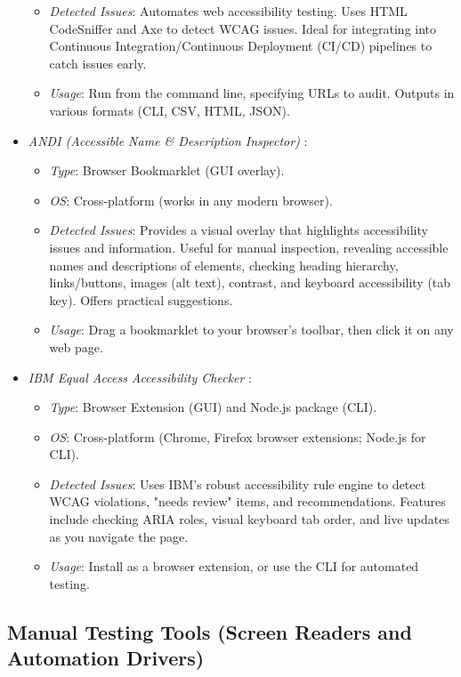 \begin{itemize}
\begin{itemize}
            \item \emph{Detected Issues}: Automates web accessibility testing. Uses HTML CodeSniffer and Axe to detect WCAG issues. Ideal for integrating into Continuous Integration/Continuous Deployment (CI/CD) pipelines to catch issues early.
            \item \emph{Usage}: Run from the command line, specifying URLs to audit. Outputs in various formats (CLI, CSV, HTML, JSON).
        \end{itemize}
    \item \emph{ANDI (Accessible Name \& Description Inspector)} \cite{andi}:
        \begin{itemize}
            \item \emph{Type}: Browser Bookmarklet (GUI overlay).
            \item \emph{OS}: Cross-platform (works in any modern browser).
            \item \emph{Detected Issues}: Provides a visual overlay that highlights accessibility issues and information. Useful for manual inspection, revealing accessible names and descriptions of elements, checking heading hierarchy, links/buttons, images (alt text), contrast, and keyboard accessibility (tab key). Offers practical suggestions.
            \item \emph{Usage}: Drag a bookmarklet to your browser's toolbar, then click it on any web page.
        \end{itemize}
    \item \emph{IBM Equal Access Accessibility Checker} \cite{ibmequalaccess}:
        \begin{itemize}
            \item \emph{Type}: Browser Extension (GUI) and Node.js package (CLI).
            \item \emph{OS}: Cross-platform (Chrome, Firefox browser extensions; Node.js for CLI).
            \item \emph{Detected Issues}: Uses IBM's robust accessibility rule engine to detect WCAG violations, "needs review" items, and recommendations. Features include checking ARIA roles, visual keyboard tab order, and live updates as you navigate the page.
            \item \emph{Usage}: Install as a browser extension, or use the CLI for automated testing.
        \end{itemize}
\end{itemize}

\subsection{Manual Testing Tools (Screen Readers and Automation Drivers)}
\label{subsec:manual-testing-tools}

